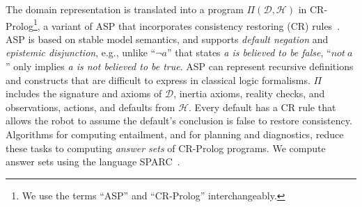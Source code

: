 \documentclass[letterpaper, 10 pt, conference]{ieeeconf}  %
\begin{document}
The domain representation is translated into a program
$\Pi(\mathcal{D}, \mathcal{H})$ in CR-Prolog\footnote{We use the terms
  ``ASP'' and ``CR-Prolog'' interchangeably.}, a variant of ASP that
incorporates consistency restoring (CR)
rules~\cite{balduccini:aaaisymp03}. ASP is based on stable model
semantics, and supports \emph{default negation} and \emph{epistemic
  disjunction}, e.g., unlike ``$\lnot a$'' that states \emph{a is
  believed to be false}, ``$not~a$'' only implies \emph{a is not
  believed to be true}.  ASP can represent recursive definitions and
constructs that are difficult to express in classical logic
formalisms. $\Pi$ includes the signature and axioms of $\mathcal{D}$,
inertia axioms, reality checks, and observations, actions, and
defaults from $\mathcal{H}$. Every default has a CR rule that allows
the robot to assume the default's conclusion is false to restore
consistency.  Algorithms for computing entailment, and for planning
and diagnostics, reduce these tasks to computing \emph{answer sets} of
CR-Prolog programs. We compute answer sets using the language
SPARC~\cite{balai:lpnmr13}.

\end{document}
